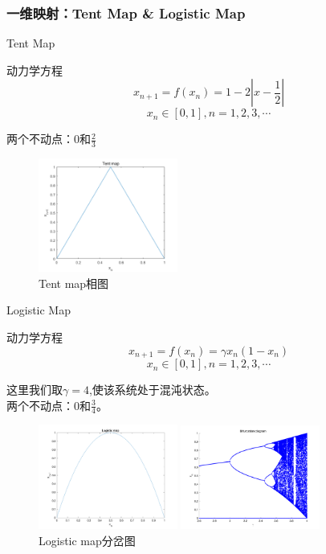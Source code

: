 \documentclass{beamer}
\begin{document}
	\subsubsection{一维映射：Tent Map \& Logistic Map}
		\begin{frame}{Tent Map}
			\begin{block}{动力学方程}
				$$x_{n+1}=f(x_n)=1-2|x-\frac{1}{2}|$$
				$$x_n\in [0,1], n=1,2,3,\cdots$$
			\end{block}
			两个不动点：0和$\frac{2}{3}$
			\begin{figure}
				\begin{minipage}{0.4\linewidth}
					\centering
					\includegraphics[width=1.8in]{figure/tent_phase}
					\caption{Tent map相图}
				\end{minipage}
			\end{figure}
		\end{frame}
		\begin{frame}{Logistic Map}
		\begin{block}{动力学方程}
			$$x_{n+1}=f(x_n)=\gamma x_n(1-x_n)$$
			$$x_n\in [0,1], n=1,2,3,\cdots$$
		\end{block}
		这里我们取$\gamma=4$,使该系统处于混沌状态。\\
		两个不动点：0和$\frac{3}{4}$。
		\begin{figure}
			\begin{minipage}{0.4\linewidth}
				\centering
				\includegraphics[width=1.8in]{figure/logistic_phase}
				\caption{Logistic map相图}
			\end{minipage}
			\begin{minipage}{0.4\linewidth}
				\centering
				\includegraphics[width=1.8in]{figure/logistic_bifurcation}
				\caption{Logistic map分岔图}
			\end{minipage}
		\end{figure}
		\end{frame}
\end{document}
